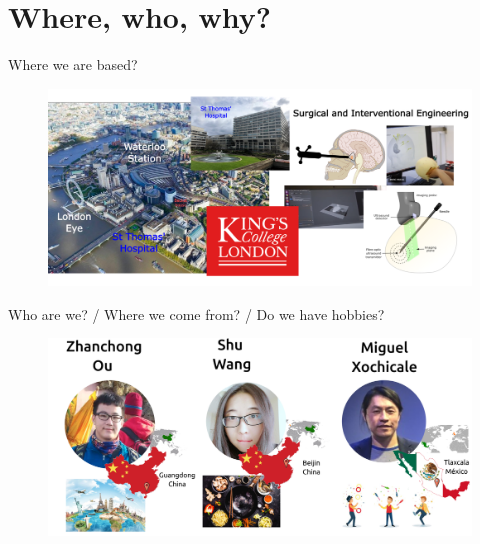 \section{Where, who, why?}



{
\begin{frame}{Where we are based?}

  \begin{figure}
  \centering
  \includegraphics[width=1.0\textwidth]{./figures/where-we-are-based/versions/drawing-v00.png}
  \end{figure}

\end{frame}
}




{
\begin{frame}{Who are we? / Where we come from? / Do we have hobbies?}

  \begin{figure}
  \centering
  \includegraphics[width=1.0\textwidth]{./figures/who-we-are/versions/drawing-v04.png}
  \end{figure}

\end{frame}
}

